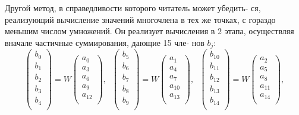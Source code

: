 \vspace{0pt}Другой метод, в справедливости которого читатель может убедить­- \linebreak
ся, реализующий вычисление значений многочлена в тех же точках, \linebreak
с гораздо меньшим числом умножений. Он реализует вычисления в 2 \linebreak
этапа, осуществляя вначале частичные суммирования, дающие 15 чле­- \linebreak
нов $b_j$:
\[
\begin{pmatrix}
 b_0 \\
 b_1 \\
 b_2 \\
 b_3 \\
 b_4 \\
\end{pmatrix} = W
\begin{pmatrix}
 a_0 \\
 a_3 \\
 a_6 \\
 a_9 \\
 a_{12} \\
\end{pmatrix}, \hspace{7pt}
\begin{pmatrix}
 b_5 \\
 b_6 \\
 b_7 \\
 b_8 \\
 b_9 \\
\end{pmatrix} = W
\begin{pmatrix}
 a_1 \\
 a_4 \\
 a_7 \\
 a_{10} \\
 a_{13} \\
\end{pmatrix}, \hspace{7pt}
\begin{pmatrix}
 b_{10} \\
 b_{11} \\
 b_{12} \\
 b_{13} \\
 b_{14} \\
\end{pmatrix} = W
\begin{pmatrix}
 a_2 \\
 a_5 \\
 a_8 \\
 a_{11} \\
 a_{14} \\
\end{pmatrix},
\] 


